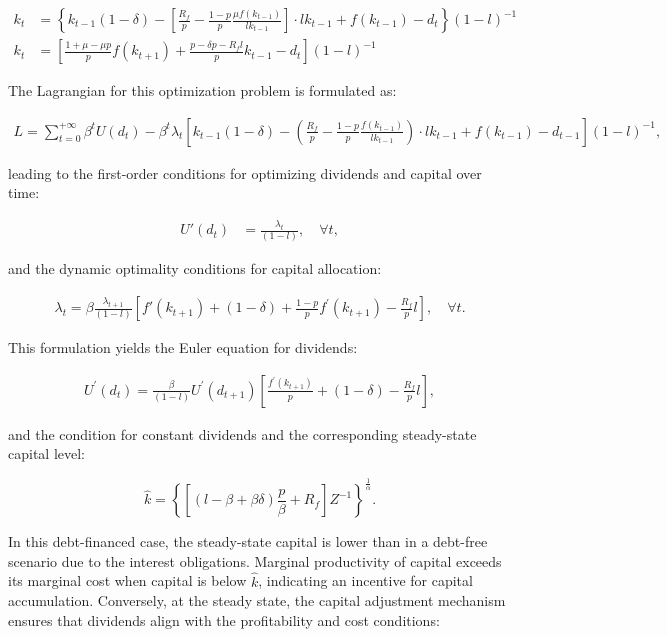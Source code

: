 \documentclass[12pt]{article}
\begin{document}
\begin{align}
    k_t &= \left\{k_{t-1}(1 - \delta) - \left[\frac{R_f}{p}  -\frac{ 1-p }{ p }\frac{\mu f(k_{t-1})}{l  k_{t-1}}\right] \cdot l k_{t-1} + f(k_{t-1}) - d_{t} \right \}{\left(1-l\right)}^{-1} \nonumber \\
    k_t &= \left[ \frac{1 + \mu - \mu p}{p}f(k_{t+1}) + \frac{p - \delta p - R_f l}{p} k_{t-1}  - d_{t} \right](1-l)^{-1}
\end{align}

The Lagrangian for this optimization problem is formulated as:

\begin{align}
L=\sum_{t=0}^{+\infty}\beta^t U(d_t) - \beta^t \lambda_t\left[k_{t-1}(1 - \delta) - \left(\frac{R_f}{p}  -\frac{ 1-p }{ p }\frac{f(k_{t-1})}{l k_{t-1}}\right) \cdot l k_{t-1} + f(k_{t-1}) - d_{t-1}\right]{\left(1-l\right)}^{-1},
\end{align}

leading to the first-order conditions for optimizing dividends and capital over time:


\begin{align}
    U'(d_t) &= \frac{\lambda_t}{\left(1-l\right)}, \quad \forall t,
\end{align}


and the dynamic optimality conditions for capital allocation:


\begin{align}
    \lambda_t = \beta \frac{\lambda_{t+1}}{\left(1-l\right)} \left[ f'(k_{t+1}) + (1 - \delta) + \frac{ 1-p }{ p } f^{\prime}(k_{t+1}) - \frac{R_f}{p}l \right], \quad \forall t.
\end{align}


This formulation yields the Euler equation for dividends:

\begin{align}
U^{\prime}(d_{t})=\frac{\beta}{\left(1-l\right)} U^{\prime}(d_{t+1})\left[\frac{f^{\prime}(k_{t+1})}{p}+(1-\delta) - \frac{R_f}{p}l\right],
\end{align}

and the condition for constant dividends and the corresponding steady-state capital level:

\[
\widehat{k} = \left\{\left[\left(l - \beta + \beta \delta \right)\frac{p}{\beta}+R_f\right]Z^{-1}\right\}^{\frac{1}{\alpha}}.
\]

In this debt-financed case, the steady-state capital is lower than in a debt-free scenario due to the interest
obligations. Marginal productivity of capital exceeds its marginal cost when capital is below \(\widehat{k}\),
indicating an incentive for capital accumulation. Conversely, at the steady state, the capital adjustment  mechanism
ensures that dividends align with the profitability and cost conditions:
\end{document}
